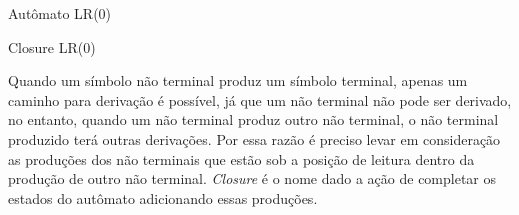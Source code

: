\begin{algorithm}[ht]
    \caption{Autômato LR(0)}\label{alg:automaton}
\end{algorithm}
\begin{algorithm}[ht]
    \caption{Closure LR(0)}\label{alg:closure}
\end{algorithm}

Quando um símbolo não terminal produz um símbolo terminal, apenas um caminho para derivação é possível, já que um não terminal não pode ser derivado, no entanto, quando um não terminal produz outro não terminal, o não terminal produzido terá outras derivações. Por essa razão é preciso levar em consideração as produções dos não terminais que estão sob a posição de leitura dentro da produção de outro não terminal. \textit{Closure} é o nome dado a ação de completar os estados do autômato adicionando essas produções.

